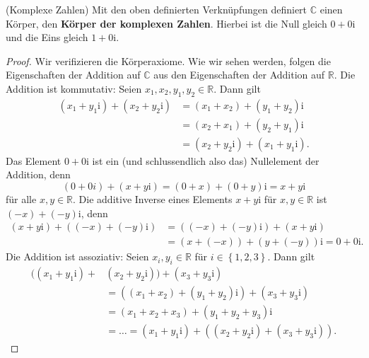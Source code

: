 \documentclass[../Analysis1_script.tex]{subfiles}
\begin{document}
\begin{proposition}{(Komplexe Zahlen)}\label{complex:complex_numbers}
	Mit den oben definierten Verknüpfungen definiert $\mathbb {C}$ einen Körper, den \textbf{Körper der komplexen Zahlen}. Hierbei ist die Null gleich $0+0\mathrm {i}$ und die Eins gleich $1+0\mathrm {i}$.
\end{proposition}

\begin{proof}
	Wir verifizieren die Körperaxiome. Wie wir sehen werden, folgen die Eigenschaften der Addition auf $\mathbb {C}$ aus den Eigenschaften der Addition auf $\mathbb {R}$. Die Addition ist kommutativ: Seien $x_1,x_2,y_1,y_2 \in \mathbb {R}$. Dann gilt
	\begin{equation}
	\begin{aligned}
		(x_1+y_1\mathrm {i}) + (x_2+y_2\mathrm {i}) &= (x_1+x_2)+(y_1+y_2)\mathrm {i} \\ &= (x_2+x_1)+(y_2+y_1)\mathrm {i}\\ &= (x_2+y_2\mathrm {i}) +(x_1+y_1\mathrm {i}).
	\end{aligned}
	\end{equation}  
	Das Element $0+0\mathrm {i}$ ist ein (und schlussendlich also das) Nullelement der Addition, denn 
	\begin{equation}
		(0+0i) + (x+y\mathrm {i}) = (0+x)+(0+y)\mathrm {i} = x+y\mathrm {i}
	\end{equation}
	für alle $x,y\in \mathbb {R}$. Die additive Inverse eines Elements $x+y\mathrm {i}$ für $x,y \in \mathbb {R}$ ist $(-x)+(-y)\mathrm {i}$, denn 
	\begin{equation}
	\begin{aligned}
		(x+y\mathrm {i})+((-x)+(-y)\mathrm {i}) &= ((-x)+(-y)\mathrm {i}) + (x+y\mathrm {i}) \\ &= (x+(-x)) + (y+(-y)) \mathrm {i} = 0+0\mathrm {i}.
	\end{aligned}
	\end{equation} 
	Die Addition ist assoziativ: Seien $x_i,y_i \in \mathbb {R}$ für $i \in \left \lbrace {1,2,3} \right \rbrace$. Dann gilt
	\begin{equation}
	\begin{aligned}
		((x_1+y_1\mathrm {i}) + &(x_2+y_2\mathrm {i}))+(x_3+y_3\mathrm {i}) \\ & = ((x_1+ x_2)+(y_1+y_2)\mathrm {i})+(x_3+y_3\mathrm {i}) \\ &= (x_1+x_2+x_3) + (y_1+y_2+y_3)\mathrm {i} \\ &= \ldots = (x_1+y_1\mathrm {i}) + ((x_2+y_2\mathrm {i})+(x_3+y_3\mathrm {i})).

\end{aligned}
\end{equation}
\end{proof}
\end{document}
